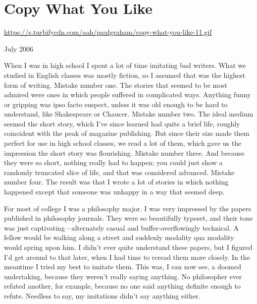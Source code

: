 \chapter{Copy What You Like}


            
              
                \href{https://s.turbifycdn.com/aah/paulgraham/copy-what-you-like-11.gif}{https://s.turbifycdn.com/aah/paulgraham/copy-what-you-like-11.gif}



July 2006


                  When I was in high school I spent a lot of time imitating bad
                  writers. What we studied in English classes was mostly
                  fiction, so I assumed that was the highest form of writing.
                  Mistake number one. The stories that seemed to be most admired
                  were ones in which people suffered in complicated ways.
                  Anything funny or gripping was ipso facto suspect, unless it
                  was old enough to be hard to understand, like Shakespeare or
                  Chaucer. Mistake number two. The ideal medium seemed the short
                  story, which I've since learned had quite a brief life,
                  roughly coincident with the peak of magazine publishing. But
                  since their size made them perfect for use in high school
                  classes, we read a lot of them, which gave us the impression
                  the short story was flourishing. Mistake number three. And
                  because they were so short, nothing really had to happen; you
                  could just show a randomly truncated slice of life, and that
                  was considered advanced. Mistake number four. The result was
                  that I wrote a lot of stories in which nothing happened except
                  that someone was unhappy in a way that seemed deep.

For
                  most of college I was a philosophy major. I was very impressed
                  by the papers published in philosophy journals. They were so
                  beautifully typeset, and their tone was just
                  captivating---alternately casual and buffer-overflowingly
                  technical. A fellow would be walking along a street and
                  suddenly modality qua modality would spring upon him. I didn't
                  ever quite understand these papers, but I figured I'd get
                  around to that later, when I had time to reread them more
                  closely. In the meantime I tried my best to imitate them. This
                  was, I can now see, a doomed undertaking, because they weren't
                  really saying anything. No philosopher ever refuted another,
                  for example, because no one said anything definite enough to
                  refute. Needless to say, my imitations didn't say anything
                  either.

